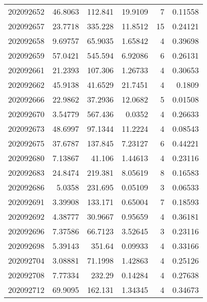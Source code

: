 \begin{tabular}{rrrrrr}
 202092652 &         46.8063  &      112.841  &           19.9109  &           7 & 0.11558 \\
 202092657 &         23.7718  &      335.228  &           11.8512  &          15 & 0.24121 \\
 202092658 &          9.69757 &       65.9035 &            1.65842 &           4 & 0.39698 \\
 202092659 &         57.0421  &      545.594  &            6.92086 &           6 & 0.26131 \\
 202092661 &         21.2393  &      107.306  &            1.26733 &           4 & 0.30653 \\
 202092662 &         45.9138  &       41.6529 &           21.7451  &           4 & 0.1809  \\
 202092666 &         22.9862  &       37.2936 &           12.0682  &           5 & 0.01508 \\
 202092670 &          3.54779 &      567.436  &            0.0352  &           4 & 0.26633 \\
 202092673 &         48.6997  &       97.1344 &           11.2224  &           4 & 0.08543 \\
 202092675 &         37.6787  &      137.845  &            7.23127 &           6 & 0.44221 \\
 202092680 &          7.13867 &       41.106  &            1.44613 &           4 & 0.23116 \\
 202092683 &         24.8474  &      219.381  &            8.05619 &           8 & 0.16583 \\
 202092686 &          5.0358  &      231.695  &            0.05109 &           3 & 0.06533 \\
 202092691 &          3.39908 &      133.171  &            0.65004 &           7 & 0.18593 \\
 202092692 &          4.38777 &       30.9667 &            0.95659 &           4 & 0.36181 \\
 202092696 &          7.37586 &       66.7123 &            3.52645 &           3 & 0.23116 \\
 202092698 &          5.39143 &      351.64   &            0.09933 &           4 & 0.33166 \\
 202092704 &          3.08881 &       71.1998 &            1.42863 &           4 & 0.25126 \\
 202092708 &          7.77334 &      232.29   &            0.14284 &           4 & 0.27638 \\
 202092712 &         69.9095  &      162.131  &            1.34345 &           4 & 0.34673 \\

\end{tabular}
